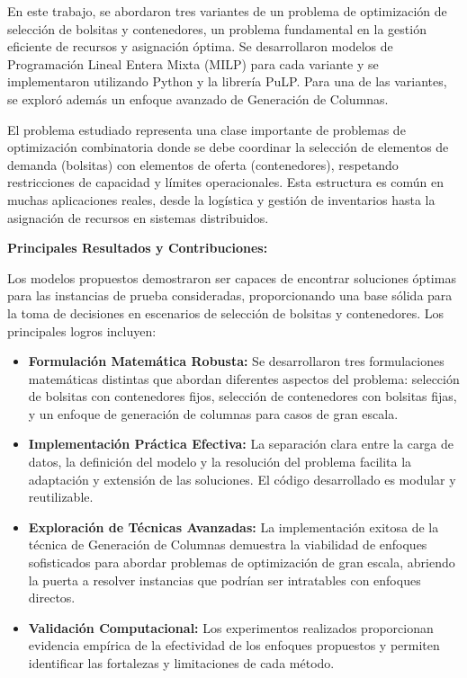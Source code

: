\documentclass[a4paper,12pt]{article}
\begin{document}
En este trabajo, se abordaron tres variantes de un problema de optimización de selección de bolsitas y contenedores, un problema fundamental en la gestión eficiente de recursos y asignación óptima. Se desarrollaron modelos de Programación Lineal Entera Mixta (MILP) para cada variante y se implementaron utilizando Python y la librería PuLP. Para una de las variantes, se exploró además un enfoque avanzado de Generación de Columnas.

El problema estudiado representa una clase importante de problemas de optimización combinatoria donde se debe coordinar la selección de elementos de demanda (bolsitas) con elementos de oferta (contenedores), respetando restricciones de capacidad y límites operacionales. Esta estructura es común en muchas aplicaciones reales, desde la logística y gestión de inventarios hasta la asignación de recursos en sistemas distribuidos.

\textbf{Principales Resultados y Contribuciones:}

Los modelos propuestos demostraron ser capaces de encontrar soluciones óptimas para las instancias de prueba consideradas, proporcionando una base sólida para la toma de decisiones en escenarios de selección de bolsitas y contenedores. Los principales logros incluyen:

\begin{itemize}
    \item \textbf{Formulación Matemática Robusta:} Se desarrollaron tres formulaciones matemáticas distintas que abordan diferentes aspectos del problema: selección de bolsitas con contenedores fijos, selección de contenedores con bolsitas fijas, y un enfoque de generación de columnas para casos de gran escala.
    
    \item \textbf{Implementación Práctica Efectiva:} La separación clara entre la carga de datos, la definición del modelo y la resolución del problema facilita la adaptación y extensión de las soluciones. El código desarrollado es modular y reutilizable.
    
    \item \textbf{Exploración de Técnicas Avanzadas:} La implementación exitosa de la técnica de Generación de Columnas demuestra la viabilidad de enfoques sofisticados para abordar problemas de optimización de gran escala, abriendo la puerta a resolver instancias que podrían ser intratables con enfoques directos.
    
    \item \textbf{Validación Computacional:} Los experimentos realizados proporcionan evidencia empírica de la efectividad de los enfoques propuestos y permiten identificar las fortalezas y limitaciones de cada método.
\end{itemize}
\end{document}

